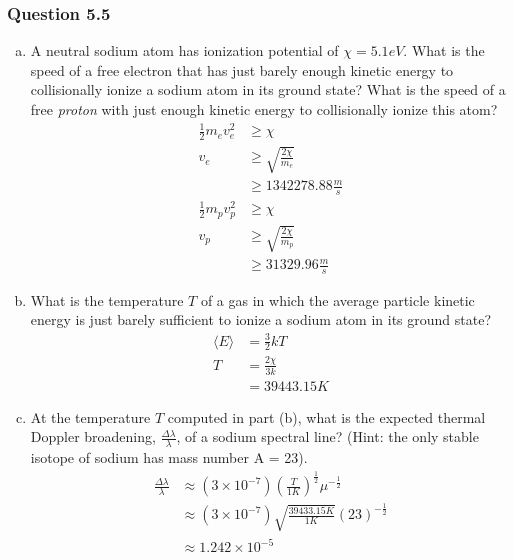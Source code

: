 \documentclass{math}
\begin{document}
\subsubsection*{Question 5.5}
\begin{enumerate}[(a)]
  \item A neutral sodium atom has ionization potential of \( \chi = 5.1eV \).
    What is the speed of a free electron that has just barely enough kinetic
    energy to collisionally ionize a sodium atom in its ground state? What is
    the speed of a free \textit{proton} with just enough kinetic energy to
    collisionally ionize this atom?
    \begin{align*}
      \frac{1}{2}m_ev_e^2 &\ge \chi \\
      v_e &\ge \sqrt{\frac{2\chi}{m_e}} \\
      &\ge 1342278.88\frac{m}{s} \\
      \frac{1}{2}m_pv_p^2 &\ge \chi \\
      v_p &\ge \sqrt{\frac{2\chi}{m_p}} \\
      &\ge 31329.96\frac{m}{s}
    \end{align*}
  \item What is the temperature \( T \) of a gas in which the average particle
    kinetic energy is just barely sufficient to ionize a sodium atom in its
    ground state?
    \begin{align*}
      \langle E\rangle &= \frac{3}{2}kT \\
      T &= \frac{2\chi}{3k} \\
      &= 39443.15 K
    \end{align*}
  \item At the temperature \( T \) computed in part (b), what is the expected
    thermal Doppler broadening, \( \frac{\Delta\lambda}{\lambda} \), of a sodium
    spectral line? (Hint: the only stable isotope of sodium has mass number
    A = 23).
    \begin{align*}
      \frac{\Delta\lambda}{\lambda} &\approx
        (3\times10^{-7})\left(\frac{T}{1K}\right)^{\frac{1}{2}}
        \mu^{-\frac{1}{2}} \\
      &\approx (3\times10^{-7})\sqrt{\frac{39433.15K}{1K}}(23)^{-\frac{1}{2}} \\
      &\approx 1.242\times10^{-5}
    \end{align*}
\end{enumerate}
\end{document}
